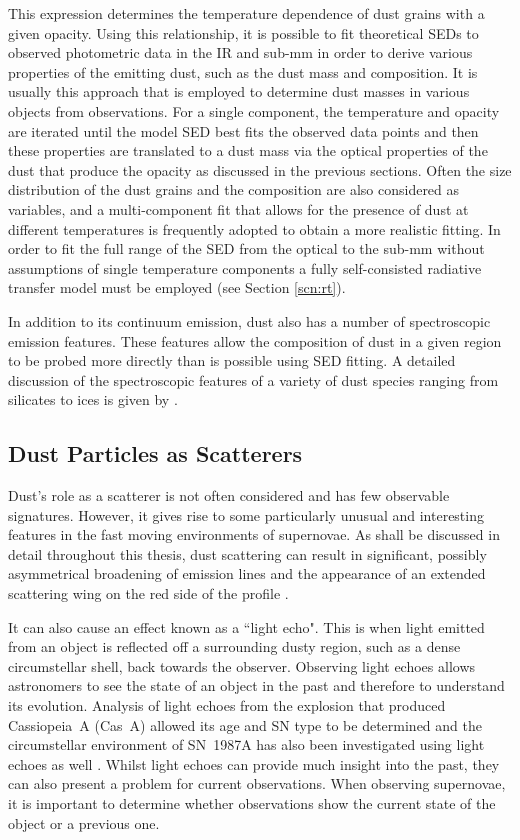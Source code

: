 \noindent This expression determines the temperature dependence of dust grains with a given opacity. Using this relationship, it is possible to fit theoretical SEDs to  observed photometric data in the IR and sub-mm in order to derive various properties of the emitting dust, such as the dust mass and composition.  It is usually this approach that is employed to determine dust masses in various objects from observations.  For a single component, the temperature and opacity are iterated until the model SED best fits the observed data points and then these properties are translated to a dust mass via the optical properties of the dust that produce the opacity as discussed in the previous sections.  Often the size distribution of the dust grains and the composition are also considered as variables, and a multi-component fit that allows for the presence of dust at different temperatures is frequently adopted to obtain a  more realistic fitting.  In order to fit  the full range of the SED from the optical to the sub-mm without assumptions of single temperature components  a fully self-consisted radiative transfer model must be employed (see Section \ref{scn:rt}).

In addition to its continuum emission, dust also has a number of spectroscopic emission features.  These features allow the composition of dust in a given region to be probed more directly than is possible using SED fitting.  A detailed discussion of the spectroscopic features of a variety of dust species ranging from silicates to ices is given by \citet{Draine2003}. 

\subsection{Dust Particles as Scatterers}
\label{scn:le}
Dust's role as a scatterer is not often considered and has few observable signatures.  However, it gives rise to some particularly unusual and interesting features in the fast moving environments of supernovae.  As shall be discussed in detail throughout this thesis, dust scattering can result in significant, possibly asymmetrical broadening of emission lines and the appearance of an extended scattering wing on the red side of the profile \citep{Lucy1989}. 

 It can also cause an effect known as a ``light echo".  This is when light emitted from an object is reflected off a surrounding dusty region, such as a dense circumstellar shell, back towards the observer. Observing light echoes allows astronomers to see the state of an object in the past and therefore to understand its evolution.  Analysis of light echoes from the explosion that produced Cassiopeia~A (Cas~A) allowed its age and SN type to be determined \citep{Krause2008} and the circumstellar environment of SN~1987A has also been investigated using light echoes as well \citep{Crotts1989,Sugerman2005}.  Whilst light echoes can provide much insight into the past, they can also present a problem for current observations.  When observing supernovae, it is important to determine whether observations show the current state of the object or a previous one.

